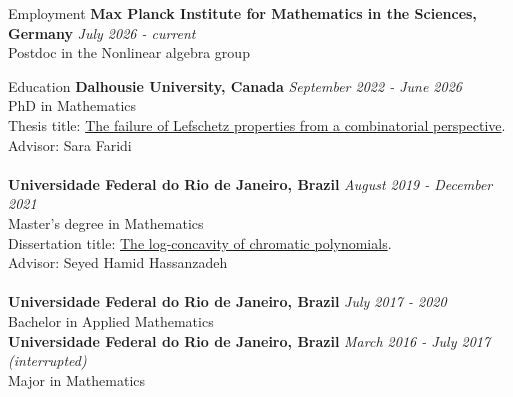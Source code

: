 \documentclass[12pt]{resume} %
\begin{document}

\begin{rSection}{Employment}
{\bf Max Planck Institute for Mathematics in the Sciences, Germany} \hfill {\em July 2026 - current} 
\\ Postdoc in the Nonlinear algebra group
\end{rSection}




\begin{rSection}{Education}
{\bf Dalhousie University, Canada} \hfill {\em September 2022 - June 2026} 
\\ PhD in Mathematics
\\ Thesis title: \href{https://hollebenthiago.github.io/phd/thesis.pdf}{The failure of Lefschetz properties from a combinatorial perspective}.
\\ Advisor: Sara Faridi
\\
\\{\bf Universidade Federal do Rio de Janeiro, Brazil} \hfill {\em August 2019 - December 2021} 
\\ Master's degree in Mathematics
\\ Dissertation title: \href{https://hollebenthiago.github.io/msc/main.pdf}{The log-concavity of chromatic polynomials}.
\\ Advisor: Seyed Hamid Hassanzadeh
\\
\\
{\bf Universidade Federal do Rio de Janeiro, Brazil} \hfill {\em July 2017 - 2020} 
\\ Bachelor in Applied Mathematics
\\
{\bf Universidade Federal do Rio de Janeiro, Brazil} \hfill {\em March 2016 - July 2017 (interrupted)} 
\\ Major in Mathematics
\\
\end{rSection}

\end{document}
